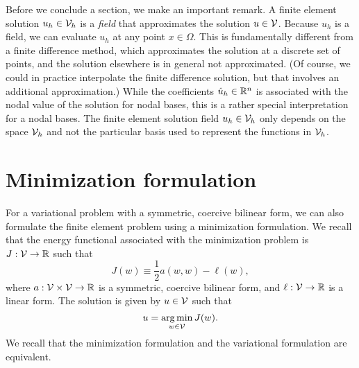 Before we conclude a section, we make an important remark.  A finite element solution $u_h \in \mathcal{V}_h$ is a \emph{field} that approximates the solution $u \in \mathcal{V}$. Because $u_h$ is a field, we can evaluate $u_h$ at any point $x \in \Omega$.  This is fundamentally different from a finite difference method, which approximates the solution at a discrete set of points, and the solution elsewhere is in general not approximated.  (Of course, we could in practice interpolate the finite difference solution, but that involves an additional approximation.)  While the coefficients $\hat u_h \in \mathbb{R}^n$ is associated with the nodal value of the solution for nodal bases, this is a rather special interpretation for a nodal bases. The finite element solution field $u_h \in \mathcal{V}_h$ only depends on the space $\mathcal{V}_h$ and not the particular basis used to represent the functions in $\mathcal{V}_h$. 

\section{Minimization formulation}
For a variational problem with a symmetric, coercive bilinear form, we can also formulate the finite element problem using a minimization formulation.  We recall that the energy functional associated with the minimization problem is $J: \mathcal{V} \to \mathbb{R}$ such that
\begin{equation*}
  J(w) \equiv \frac{1}{2} a(w,w) - \ell(w),
\end{equation*}
where $a: \mathcal{V} \times \mathcal{V} \to \mathbb{R}$ is a symmetric, coercive bilinear form, and $\ell: \mathcal{V} \to \mathbb{R}$ is a linear form.  The solution is given by $u \in \mathcal{V}$ such that
\begin{equation*}
  u = \operatorname*{arg\,min}_{w \in \mathcal{V}} J(w).
\end{equation*}
We recall that the minimization formulation and the variational formulation are equivalent.

